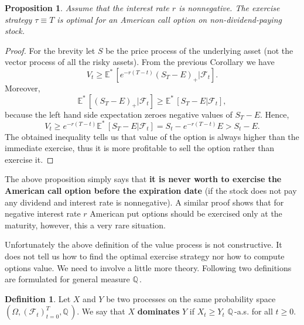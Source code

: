 \documentclass[a4paper,11pt, twoside]{book}
\newtheorem{prop}[thm]{Proposition}
\theoremstyle{definition}
\newtheorem{mydef}{Definition}[chapter]
\theoremstyle{remark}
\def\Q{{\mathbb{Q}}\,}
\def\Em{{\mathbb{E}^*}\,}
\begin{document}
\begin{prop}
 Assume that the interest rate $r$ is nonnegative. The exercise strategy $\tau \equiv T$ is optimal for an American call option on non-dividend-paying stock.
\end{prop}
\begin{proof}
 For the brevity let $S$ be the price process of the underlying asset (not the vector process of all the risky assets). From the previous Corollary we have
 \[V_t \geq \Em[e^{-r(T-t)}(S_T - E)_+ | \mathcal{F}_t].\] Moreover,
 \[\Em[(S_T - E)_+ | \mathcal{F}_t] \geq \Em[S_T - E | \mathcal{F}_t],\]
 because the left hand side expectation zeroes negative values of $S_T - E$. Hence,
 \[ V_t \geq e^{-r(T-t)}\Em[S_T - E | \mathcal{F}_t] = S_t - e^{-r(T-t)}E > S_t - E.\]
 The obtained inequality tells us that value of the option is always higher than the immediate exercise, thus it is more profitable to sell the option rather than exercise it.
\end{proof}
The above proposition simply says that \textbf{it is never worth to exercise the American call option before the expiration date} (if the stock does not pay any dividend and interest rate is nonnegative). A similar proof shows that for negative interest rate $r$ American put options should be exercised only at the maturity, however, this a very rare situation.

Unfortunately the above definition of the value process is not constructive. It does not tell us how to find the optimal exercise strategy nor how to compute options value. We need to involve a little more theory. Following two definitions are formulated for general measure $\Q$. 

\begin{mydef}
 Let $X$ and $Y$ be two processes on the same probability space\\ $(\Omega, (\mathcal{F}_t)_{t=0}^T, \Q)$. We say that $X$ \textbf{dominates} $Y$ if $ X_t \geq Y_t$ $\Q$-a.s. for all $t \geq 0$.
\end{mydef}
 
\end{document}
